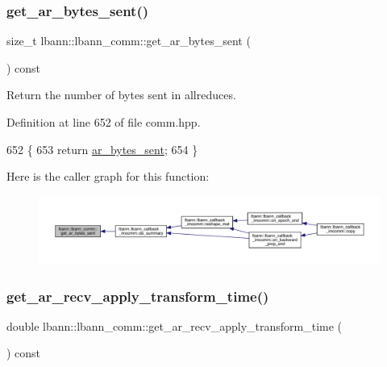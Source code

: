 \subsubsection{\texorpdfstring{get\+\_\+ar\+\_\+bytes\+\_\+sent()}{get\_ar\_bytes\_sent()}}
{\footnotesize\ttfamily size\+\_\+t lbann\+::lbann\+\_\+comm\+::get\+\_\+ar\+\_\+bytes\+\_\+sent (\begin{DoxyParamCaption}{ }\end{DoxyParamCaption}) const\hspace{0.3cm}{\ttfamily [inline]}}

Return the number of bytes sent in allreduces. 

Definition at line 652 of file comm.\+hpp.


\begin{DoxyCode}
652                                           \{
653     \textcolor{keywordflow}{return} \hyperlink{classlbann_1_1lbann__comm_aa520c16eafde742b70daf60866afc6a8}{ar\_bytes\_sent};
654   \}
\end{DoxyCode}
Here is the caller graph for this function\+:\nopagebreak
\begin{figure}[H]
\begin{center}
\leavevmode
\includegraphics[width=350pt]{classlbann_1_1lbann__comm_ae0be48a03e4e8af43929c97a31a8f361_icgraph}
\end{center}
\end{figure}
\mbox{\label{classlbann_1_1lbann__comm_a893af1da4330be474871eeb8b2f9a7b5}} 
\subsubsection{\texorpdfstring{get\+\_\+ar\+\_\+recv\+\_\+apply\+\_\+transform\+\_\+time()}{get\_ar\_recv\_apply\_transform\_time()}}
{\footnotesize\ttfamily double lbann\+::lbann\+\_\+comm\+::get\+\_\+ar\+\_\+recv\+\_\+apply\+\_\+transform\+\_\+time (\begin{DoxyParamCaption}{ }\end{DoxyParamCaption}) const\hspace{0.3cm}{\ttfamily [inline]}}

